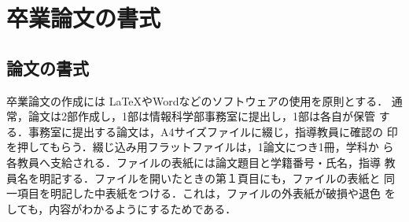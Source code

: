 \thispagestyle{myheadings}
\chapter{卒業論文の書式}
\label{sec:format}

\section{論文の書式}
\label{sec:format_thesis}

卒業論文の作成には \LaTeX やWordなどのソフトウェアの使用を原則とする．
通常，論文は2部作成し，1部は情報科学部事務室に提出し，1部は各自が保管
する．事務室に提出する論文は，A4サイズファイルに綴じ，指導教員に確認の
印を押してもらう．綴じ込み用フラットファイルは，1論文につき1冊，学科か
ら各教員へ支給される．ファイルの表紙には論文題目と学籍番号・氏名，指導
教員名を明記する．ファイルを開いたときの第１頁目にも，ファイルの表紙と
同一項目を明記した中表紙をつける．これは，ファイルの外表紙が破損や退色
をしても，内容がわかるようにするためである．


